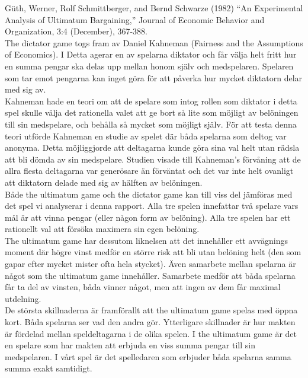 \noindent Güth, Werner, Rolf Schmittberger, and Bernd Schwarze (1982) “An Experimental Analysis of Ultimatum Bargaining,” Journal of Economic Behavior and Organization, 3:4 (December), 367-388.\\

\noindent The dictator game togs fram av Daniel Kahneman (Fairness and the Assumptions of Economics). I Detta agerar en av spelarna diktator och får välja helt fritt hur en summa pengar ska delas upp mellan honom själv och medspelaren. Spelaren som tar emot pengarna kan inget göra för att påverka hur mycket diktatorn delar med sig av. \\

\noindent Kahneman hade en teori om att de spelare som intog rollen som diktator i detta spel skulle välja det rationella valet att ge bort så lite som möjligt av belöningen till sin medspelare, och behålla så mycket som möjligt själv. För att testa denna teori utförde Kahneman en studie av spelet där båda  spelarna som deltog var anonyma. Detta möjliggjorde att deltagarna kunde göra sina val helt utan rädsla att bli dömda av sin medspelare. Studien visade till Kahneman’s förvåning att de allra flesta deltagarna var generösare än förväntat och det var inte helt ovanligt att diktatorn delade med sig av hälften av belöningen.\\

\noindent Både the ultimatum game och the dictator game kan till viss del jämföras med det spel vi analyserar i denna rapport. Alla tre spelen innefattar två spelare vars mål är att vinna pengar (eller någon form av belöning). Alla tre spelen har ett rationellt val att försöka maximera sin egen belöning.\\

\noindent The ultimatum game har dessutom liknelsen att det innehåller ett avvägnings moment där högre vinst medför en större risk att bli utan belöning helt (den som gapar efter mycket mister ofta hela stycket). Även samarbete mellan spelarna är något som the ultimatum game innehåller. Samarbete medför att båda spelarna får ta del av vinsten, båda vinner något, men att ingen av dem får maximal utdelning.\\

\noindent De största skillnaderna är framförallt att the ultimatum game spelas med öppna kort. Båda spelarna ser vad den andra gör. Ytterligare skillnader är hur makten är fördelad mellan speldeltagarna i de olika spelen. I the ultimatum game är det en spelare som har makten att erbjuda en viss summa pengar till sin medspelaren. I vårt spel är det spelledaren som erbjuder båda spelarna samma summa exakt samtidigt.\\

